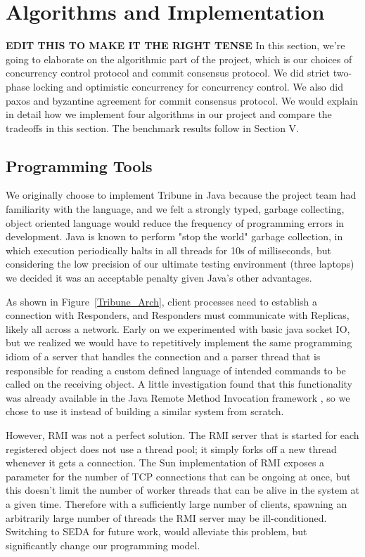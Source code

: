 \documentclass[10pt,twocolumn]{article}
\begin{document}
\section{Algorithms and Implementation}

\textbf{EDIT THIS TO MAKE IT THE RIGHT TENSE}
In this section, we're going to elaborate on the algorithmic part of the project, which is our choices of concurrency control protocol and commit consensus protocol. We did strict two-phase locking and optimistic concurrency for concurrency control. We also did paxos and byzantine agreement for commit consensus protocol. We would explain in detail how we implement four algorithms in our project and compare the tradeoffs in this section. The benchmark results follow in Section V.

\subsection{Programming Tools}

We originally choose to implement Tribune in Java because the project team had familiarity with the language, and we felt a strongly typed, garbage collecting, object oriented language would reduce the frequency of programming errors in development. Java is known to perform "stop the world" garbage collection, in which execution periodically halts in all threads for 10s of milliseconds, but considering the low precision of our ultimate testing environment (three laptops) we decided it was an acceptable penalty given Java's other advantages.

As shown in Figure~\ref{Tribune_Arch}, client processes need to establish a connection with Responders, and Responders must communicate with Replicas, likely all across a network. Early on we experimented with basic java socket IO, but we realized we would have to repetitively implement the same programming idiom of a server that handles the connection and a parser thread that is responsible for reading a custom defined language of intended commands to be called on the receiving object. A little investigation found that this functionality was already available in the Java Remote Method Invocation framework \cite{Pitt:2001:JRM:558733},  so we chose to use it instead of building a similar system from scratch.

However, RMI was not a perfect solution. The RMI server that is started for each registered object does not use a thread pool; it simply forks off a new thread whenever it gets a connection. The Sun implementation of RMI exposes a parameter for the number of TCP connections that can be ongoing at once, but this doesn't limit the number of worker threads that can be alive in the system at a given time. Therefore with a sufficiently large number of clients, spawning an arbitrarily large number of threads the RMI server may be ill-conditioned. Switching to SEDA \cite{welsh_seda:_2001} for future work, would alleviate this problem, but significantly change our programming model.
\end{document}
